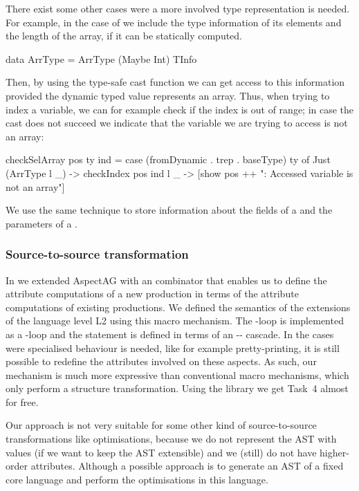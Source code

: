 There exist some other cases were a more involved type representation is needed.
For example, in the case of  we include the type information of its elements 
and the length of the array, if it can be statically computed.
\begin{haskell}
data ArrType = ArrType (Maybe Int) TInfo 
\end{haskell}
Then, by using the type-safe cast function  we can get access to 
this information provided the dynamic typed value represents an array.
Thus, when trying to index a variable, we can for example check if the index is out of range;
in case the cast does not succeed we  indicate that the variable we are trying to access is not an array:
\begin{haskell}
checkSelArray pos ty ind
  = case (fromDynamic . trep . baseType) ty of
     Just (ArrType l _) -> checkIndex pos ind l
     _                  -> [show pos ++ 
                            ": Accessed variable is not an array"] 
\end{haskell}
We use the same technique to store information about the fields of a 
and the parameters of a .

\subsubsection{Source-to-source transformation}
\label{sec:agmacro}

In \cite{VS12} we extended AspectAG with an  combinator that enables us
to define the attribute computations of a new production in terms of the attribute computations of existing productions.
We defined the semantics of the extensions of the language level L2 using this macro mechanism.
The -loop is implemented as a -loop 
and the  statement is defined in terms of an -- cascade.
In the cases were specialised behaviour is needed, like for example pretty-printing, it is still possible to redefine the attributes
involved on these aspects. As such, our mechanism is much more expressive than conventional macro mechanisms, which only perform a structure transformation. Using the library we get Task~4 almost for free.

Our approach is not very suitable for some other kind of source-to-source transformations like optimisations,
because we do not represent the AST with values (if we want to keep the AST extensible) and
we (still) do not have higher-order attributes.
Although a possible approach is to generate an AST of a fixed core language and perform 
the optimisations in this language.

